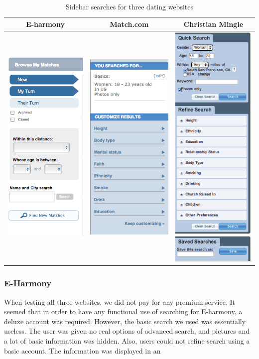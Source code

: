 \documentclass{article}
\begin{document}
\begin{table}
\caption{Sidebar searches for three dating websites}
\centering
\begin{tabular}{|c|c|c|}\hline
E-harmony & Match.com & Christian Mingle \\\hline\hline\hline
\includegraphics[width = 2in]{Eharm2.png} & \includegraphics[width = 2in]{Match2.png} & \includegraphics[width = 2in]{CM2} \\\hline
\end{tabular}
\end{table}
\subsubsection{E-Harmony}
When testing all three websites, we did not pay for any premium service. It seemed that in order to have any functional use of searching for E-harmony, a deluxe account was required. However, the basic search we used was essentially useless. The user was given no real options of advanced search, and pictures and a lot of basic information was hidden. Also, users could not refine search using a basic account. The information was displayed in an
\end{document}
